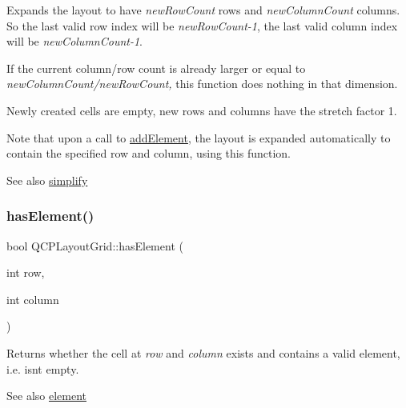 Expands the layout to have {\itshape new\+Row\+Count} rows and {\itshape new\+Column\+Count} columns. So the last valid row index will be {\itshape new\+Row\+Count-\/1}, the last valid column index will be {\itshape new\+Column\+Count-\/1}.

If the current column/row count is already larger or equal to {\itshape new\+Column\+Count/{\itshape new\+Row\+Count},} this function does nothing in that dimension.

Newly created cells are empty, new rows and columns have the stretch factor 1.

Note that upon a call to \mbox{\hyperlink{class_q_c_p_layout_grid_adff1a2ca691ed83d2d24a4cd1fe17012}{add\+Element}}, the layout is expanded automatically to contain the specified row and column, using this function.

\begin{DoxySeeAlso}{See also}
\mbox{\hyperlink{class_q_c_p_layout_grid_a08bba60e4acd20165526a8fd7f986b58}{simplify}} 
\end{DoxySeeAlso}
\mbox{\label{class_q_c_p_layout_grid_ab0cf4f7edc9414a3bfaddac0f46dc0a0}} 
\subsubsection{\texorpdfstring{has\+Element()}{hasElement()}}
{\footnotesize\ttfamily bool Q\+C\+P\+Layout\+Grid\+::has\+Element (\begin{DoxyParamCaption}\item[{int}]{row,  }\item[{int}]{column }\end{DoxyParamCaption})}

Returns whether the cell at {\itshape row} and {\itshape column} exists and contains a valid element, i.\+e. isn\textquotesingle{}t empty.

\begin{DoxySeeAlso}{See also}
\mbox{\hyperlink{class_q_c_p_layout_grid_a602b426609b4411cf6a93c3ddf3a381a}{element}} 
\end{DoxySeeAlso}
\mbox{\label{class_q_c_p_layout_grid_a1e880a321dbe8b43b471ccd764433dc4}} 
